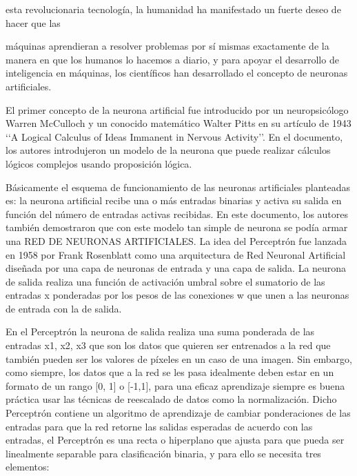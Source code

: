 esta revolucionaria tecnología, la humanidad ha manifestado un fuerte deseo de hacer que las

máquinas aprendieran a resolver problemas por sí mismas exactamente de la manera en que los humanos lo hacemos a diario, y para apoyar el desarrollo de inteligencia en máquinas, los científicos han desarrollado el concepto de neuronas artificiales.

El primer concepto de la neurona artificial fue introducido por un neuropsicólogo Warren McCulloch y un conocido matemático Walter Pitts en su artículo de 1943 ‘‘A Logical Calculus of Ideas Immanent in Nervous Activity’’. En el documento, los autores introdujeron un modelo de la neurona que puede realizar cálculos lógicos complejos usando proposición lógica.

Básicamente el esquema de funcionamiento de las neuronas artificiales planteadas es: la neurona artificial recibe una o más entradas binarias y activa su salida en función del número de entradas activas recibidas. En este documento, los autores también demostraron que con este modelo tan simple de neurona se podía armar una RED DE NEURONAS ARTIFICIALES. La idea del Perceptrón fue lanzada en 1958 por Frank Rosenblatt como una arquitectura de Red Neuronal Artificial diseñada por una capa de neuronas de entrada y una capa de salida. La neurona de salida realiza una función de activación umbral sobre el sumatorio de las entradas x ponderadas por los pesos de las conexiones w que unen a las neuronas de entrada con la de salida.

En el Perceptrón la neurona de salida realiza
una suma ponderada de las entradas x1, x2, x3 que son los datos que quieren
ser entrenados a la red que también pueden ser los valores de píxeles en un
caso de una imagen. Sin embargo, como siempre, los datos que a la red se les
pasa idealmente deben estar en un formato de un rango [0, 1] o [-1,1], para
una eficaz aprendizaje siempre es buena práctica usar las técnicas de reescalado
de datos como la normalización. Dicho Perceptrón contiene un algoritmo de
aprendizaje de cambiar ponderaciones de las entradas para que la red retorne
las salidas esperadas de acuerdo con las entradas, el Perceptrón es una recta o
hiperplano que ajusta para que pueda ser linealmente separable para clasificación
binaria, y para ello se necesita tres elementos:

